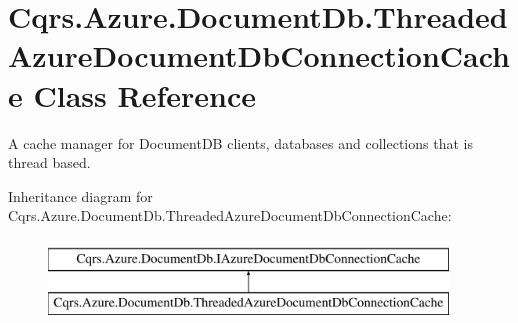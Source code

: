 \hypertarget{classCqrs_1_1Azure_1_1DocumentDb_1_1ThreadedAzureDocumentDbConnectionCache}{}\section{Cqrs.\+Azure.\+Document\+Db.\+Threaded\+Azure\+Document\+Db\+Connection\+Cache Class Reference}
\label{classCqrs_1_1Azure_1_1DocumentDb_1_1ThreadedAzureDocumentDbConnectionCache}


A cache manager for Document\+DB clients, databases and collections that is thread based.  


Inheritance diagram for Cqrs.\+Azure.\+Document\+Db.\+Threaded\+Azure\+Document\+Db\+Connection\+Cache\+:\begin{figure}[H]
\begin{center}
\leavevmode
\includegraphics[height=2.000000cm]{classCqrs_1_1Azure_1_1DocumentDb_1_1ThreadedAzureDocumentDbConnectionCache}
\end{center}
\end{figure}
